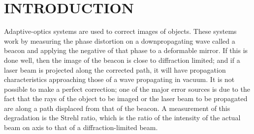 
\begin{abstract}                %
There are many ways in which the paths of two waves through
turbulence  can become separated, thereby leading to anisoplanatic
effects.  Among  these are a parallel path separation, an angular
separation, one caused  by a time delay, and one that is due to
differential refraction at two  wavelengths.  All these effects can
be treated in the same manner.   Gegenbauer polynomials are used to
obtain an approximation for the  Strehl ratio for these
anisoplanatic effects, yielding a greater range  of applicability
than the Mar\'{e}chal approximation.
\end{abstract}

\section{ INTRODUCTION}
Adaptive-optics systems are  used to correct images of objects.
These systems work by measuring the  phase distortion on a
downpropagating wave called a beacon and applying  the negative of that
phase to a deformable mirror.  If this is done  well, then the
image of the beacon is close to diffraction limited; and  if a
laser beam is projected along the corrected path, it will have
propagation characteristics approaching those of a wave propagating
in  vacuum.  It is not possible to make a perfect correction; one
of the  major error sources is due to the fact  that the rays of
the object to  be imaged or the laser beam to be propagated are
along a path displaced  from that of the beacon.  A measurement of
this degradation is the  Strehl ratio, which is the ratio of the
intensity of the actual beam on  axis to that of a
diffraction-limited beam.

